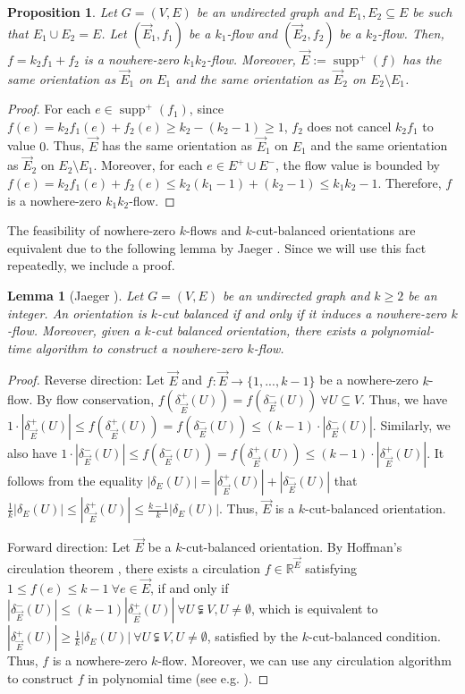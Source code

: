 \documentclass[11pt]{article}
\newtheorem{lemma}[theorem]{Lemma}
\newtheorem{prop}[theorem]{Proposition}
\newcommand{\R}{\mathbb{R}}
\DeclareMathOperator{\supp}{supp}
\begin{document}
\begin{prop}\label{prop:sum-flows}
    Let $G=(V,E)$ be an undirected graph and $E_1,E_2\subseteq E$ be such that $E_1\cup E_2=E$. Let $(\vec{E}_1,f_1)$ be a $k_1$-flow and $(\vec{E}_2,f_2)$ be a $k_2$-flow. Then, $f=k_2f_1+f_2$ is a nowhere-zero $k_1k_2$-flow. Moreover, $\vec{E}:=\supp^+(f)$ has the same orientation as $\vec{E}_1$ on $E_1$ and the same orientation as $\vec{E}_2$ on $E_2\setminus E_1$.
\end{prop}
\begin{proof}
    For each $e\in \supp^+(f_1)$, since $f(e)=k_2f_1(e)+f_2(e)\geq k_2-(k_2-1)\geq 1$, $f_2$ does not cancel $k_2f_1$ to value $0$. Thus, $\vec{E}$ has the same orientation as $\vec{E}_1$ on $E_1$ and the same orientation as $\vec{E}_2$ on $E_2\setminus E_1$. Moreover, for each $e\in E^+\cup E^-$, the flow value is bounded by $f(e)=k_2f_1(e)+f_2(e)\leq k_2(k_1-1)+(k_2-1)\leq k_1k_2-1$. Therefore, $f$ is a nowhere-zero $k_1k_2$-flow.
\end{proof}

The feasibility of nowhere-zero $k$-flows and $k$-cut-balanced orientations are equivalent due to the following lemma by Jaeger \cite{jaeger1976balanced}. Since we will use this fact repeatedly, we include a proof.
\begin{lemma}[Jaeger \cite{jaeger1976balanced}]\label{lemma:equivalence}
Let $G=(V, E)$ be an undirected graph and $k\ge 2$ be an integer. An orientation is $k$-cut balanced if and only if it induces a nowhere-zero $k$-flow. Moreover, given a $k$-cut balanced orientation, there exists a polynomial-time algorithm to construct a nowhere-zero $k$-flow.
\end{lemma}
\begin{proof}
Reverse direction: Let $\vec{E}$ and $f:\vec{E}\rightarrow \{1,...,k-1\}$ be a nowhere-zero $k$-flow. By flow conservation, $f(\delta^+_{\vec{E}}(U))=f(\delta^-_{\vec{E}}(U))\ \forall U \subseteq V$. Thus, we have $1\cdot |\delta^+_{\vec{E}}(U)|\leq f(\delta^+_{\vec{E}}(U))=f(\delta^-_{\vec{E}}(U))\leq (k-1)\cdot |\delta^-_{\vec{E}}(U)|$. Similarly, we also have $1\cdot |\delta^-_{\vec{E}}(U)|\leq f(\delta^-_{\vec{E}}(U))=f(\delta^+_{\vec{E}}(U))\leq (k-1)\cdot |\delta^+_{\vec{E}}(U)|$. It follows from the equality $|\delta_E(U)|=|\delta_{\vec{E}}^+(U)|+|\delta_{\vec{E}}^-(U)|$ that $\frac{1}{k}|\delta_{E}(U)|\leq |\delta^+_{\vec{E}}(U)|\leq \frac{k-1}{k}|\delta_{E}(U)|$. Thus, $\vec{E}$ is a $k$-cut-balanced orientation.

    Forward direction: Let $\vec{E}$ be a $k$-cut-balanced orientation. By Hoffman's circulation theorem \cite{hoffman2003some}, there exists a circulation $f\in\R^{\vec{E}}$ satisfying $1\leq f(e)\leq k-1\ \forall e\in \vec{E}$, if and only if $|\delta_{\vec{E}}^-(U)|\leq (k-1)|\delta_{\vec{E}}^+(U)|\ \forall U\subsetneqq V,U\neq\emptyset$, which is equivalent to $|\delta_{\vec{E}}^+(U)|\geq \frac{1}{k}|\delta_{E}(U)|\ \forall U\subsetneqq V,U\neq\emptyset$, satisfied by the $k$-cut-balanced condition. Thus, $f$ is a nowhere-zero $k$-flow. Moreover, we can use any circulation algorithm to construct $f$ in polynomial time (see e.g. \cite{ford2015flows,chen2022maximum}).
\end{proof}
\end{document}
